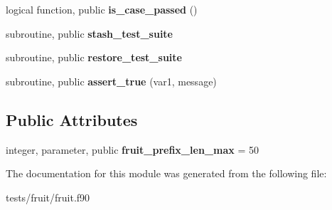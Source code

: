 \begin{DoxyCompactItemize}
\item 
\hypertarget{classfruit_abf1f31b530a047b091a3ad5b48128f35}{logical function, public {\bfseries is\-\_\-case\-\_\-passed} ()}\label{classfruit_abf1f31b530a047b091a3ad5b48128f35}

\item 
\hypertarget{classfruit_ac52561bec575b4b3d2c6a4c98fb83f52}{subroutine, public {\bfseries stash\-\_\-test\-\_\-suite}}\label{classfruit_ac52561bec575b4b3d2c6a4c98fb83f52}

\item 
\hypertarget{classfruit_aa71f35308656d1332f7367a45bb4765a}{subroutine, public {\bfseries restore\-\_\-test\-\_\-suite}}\label{classfruit_aa71f35308656d1332f7367a45bb4765a}

\item 
\hypertarget{classfruit_ae7bbf84d207714c3e7e388f4bcb31700}{subroutine, public {\bfseries assert\-\_\-true} (var1, message)}\label{classfruit_ae7bbf84d207714c3e7e388f4bcb31700}

\end{DoxyCompactItemize}
\subsection*{Public Attributes}
\begin{DoxyCompactItemize}
\item 
\hypertarget{classfruit_a9f69643429759ba03a855fb08539f067}{integer, parameter, public {\bfseries fruit\-\_\-prefix\-\_\-len\-\_\-max} = 50}\label{classfruit_a9f69643429759ba03a855fb08539f067}

\end{DoxyCompactItemize}


The documentation for this module was generated from the following file\-:\begin{DoxyCompactItemize}
\item 
tests/fruit/fruit.\-f90\end{DoxyCompactItemize}
